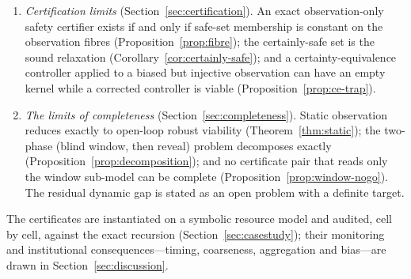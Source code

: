 \documentclass[11pt,a4paper]{article}
\theoremstyle{plain}
\theoremstyle{definition}
\theoremstyle{remark}
\begin{document}
\begin{enumerate}[leftmargin=2em,itemsep=2pt]
\item \emph{Certification limits} (Section~\ref{sec:certification}). An exact observation-only safety certifier exists if and only if safe-set membership is constant on the observation fibres (Proposition~\ref{prop:fibre}); the certainly-safe set is the sound relaxation (Corollary~\ref{cor:certainly-safe}); and a certainty-equivalence controller applied to a biased but injective observation can have an empty kernel while a corrected controller is viable (Proposition~\ref{prop:ce-trap}).
\item \emph{The limits of completeness} (Section~\ref{sec:completeness}). Static observation reduces exactly to open-loop robust viability (Theorem~\ref{thm:static}); the two-phase (blind window, then reveal) problem decomposes exactly (Proposition~\ref{prop:decomposition}); and no certificate pair that reads only the window sub-model can be complete (Proposition~\ref{prop:window-nogo}). The residual dynamic gap is stated as an open problem with a definite target.
\end{enumerate}
The certificates are instantiated on a symbolic resource model and audited, cell by cell, against the exact recursion (Section~\ref{sec:casestudy}); their monitoring and institutional consequences---timing, coarseness, aggregation and bias---are drawn in Section~\ref{sec:discussion}.
\end{document}
